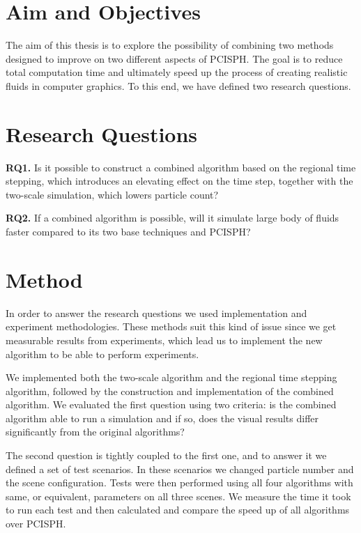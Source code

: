 \documentclass[../../main.tex]{subfiles}
\begin{document}
\tracingall

\section{Aim and Objectives}
The aim of this thesis is to explore the possibility of combining two methods designed to improve on two different aspects of PCISPH. The goal is to reduce total computation time and ultimately speed up the process of creating realistic fluids in computer graphics. To this end, we have defined two research questions.

\section{Research Questions}
\begin{displayquote}
{\large \textbf{RQ1.}} 
Is it possible to construct a combined algorithm based on the regional time stepping, which introduces an elevating effect on the time step, together with the two-scale simulation, which lowers particle count?
\end{displayquote} 

\begin{displayquote}
{\large \textbf{RQ2.}} If a combined algorithm is possible, will it simulate large body of fluids faster compared to its two base techniques and PCISPH?
\end{displayquote}


\section{Method}

In order to answer the research questions we used implementation and experiment methodologies. These methods suit this kind of issue since we get measurable results from experiments, which lead us to implement the new algorithm to be able to perform experiments.

We implemented both the two-scale algorithm and the regional time stepping algorithm, followed by the construction and implementation of the combined algorithm. We evaluated the first question using two criteria: is the combined algorithm able to run a simulation and if so, does the visual results differ significantly from the original algorithms?

The second question is tightly coupled to the first one, and to answer it we defined a set of test scenarios. In these scenarios we changed particle number and the scene configuration. Tests were then performed using all four algorithms with same, or equivalent, parameters on all three scenes. We measure the time it took to run each test and then calculated and compare the speed up of all algorithms over PCISPH. 
\end{document}
